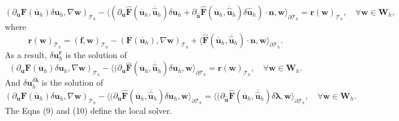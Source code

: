 \documentclass[11pt]{article}
\begin{document}
\begin{equation}
(\partial_{\bm{u}} \bm{F} (\overline{\bm{u}}_h) \delta \bm{u}_h, \nabla \bm{w})_{\mathcal{T}_h} - \langle (\partial_{\bm{u}} \widehat{\bm{F}} (\overline{\bm{u}}_h, \overline{\widehat{\bm{u}}}_h) \delta \bm{u}_h + \partial_{\widehat{\bm{u}}} \widehat{\bm{F}} (\overline{\bm{u}}_h, \overline{\widehat{\bm{u}}}_h) \delta \widehat{\bm{u}}_h) \cdot \bm{n}, \bm{w} \rangle_{\partial \mathcal{T}_h}  =  \bm{r}(\bm{w})_{\mathcal{T}_h},  \quad \forall \bm{w} \in \bm{W}_h,
\end{equation}
where
\begin{equation}
\bm{r}(\bm{w})_{\mathcal{T}_h} = (\bm{f}, \bm{w})_{\mathcal{T}_h} - (\bm{F} (\overline{\bm{u}}_h), \nabla \bm{w})_{\mathcal{T}_h} + \langle \widehat{\bm{F}} (\overline{\bm{u}}_h, \overline{\widehat{\bm{u}}}_h) \cdot \bm{n}, \bm{w} \rangle_{\partial \mathcal{T}_h} .
\end{equation}
As a result, $\delta \bm{u}_h^{\bm{r}}$ is the solution of
\begin{equation}
(\partial_{\bm{u}} \bm{F} (\overline{\bm{u}}_h) \delta \bm{u}_h, \nabla \bm{w})_{\mathcal{T}_h} - \langle (\partial_{\bm{u}} \widehat{\bm{F}} (\overline{\bm{u}}_h, \overline{\widehat{\bm{u}}}_h) \delta \bm{u}_h, \bm{w} \rangle_{\partial \mathcal{T}_h}  =  \bm{r}(\bm{w})_{\mathcal{T}_h},  \quad \forall \bm{w} \in \bm{W}_h.
\end{equation}
And $\delta \bm{u}_h^{\delta \bm{\lambda}}$ is the solution of
\begin{equation}
(\partial_{\bm{u}} \bm{F} (\overline{\bm{u}}_h) \delta \bm{u}_h, \nabla \bm{w})_{\mathcal{T}_h} - \langle (\partial_{\bm{u}} \widehat{\bm{F}} (\overline{\bm{u}}_h, \overline{\widehat{\bm{u}}}_h) \delta \bm{u}_h, \bm{w} \rangle_{\partial \mathcal{T}_h}  = \langle (\partial_{\widehat{\bm{u}}} \widehat{\bm{F}} (\overline{\bm{u}}_h, \overline{\widehat{\bm{u}}}_h) \delta \bm{\lambda}, \bm{w} \rangle_{\partial \mathcal{T}_h}, \quad \forall \bm{w} \in \bm{W}_h.
\end{equation}
The Eqns (9) and (10) define the local solver.

\end{document}
